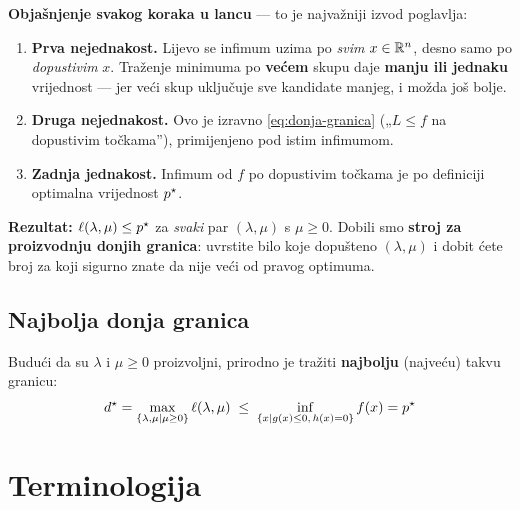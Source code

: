 \textbf{Objašnjenje svakog koraka u lancu} --- to je najvažniji izvod poglavlja:

\begin{enumerate}
  \item \textbf{Prva nejednakost.} Lijevo se infimum uzima po \emph{svim}
        $x \in \mathbb{R}^n$, desno samo po \emph{dopustivim} $x$. Traženje minimuma po
        \textbf{većem} skupu daje \textbf{manju ili jednaku} vrijednost --- jer
        veći skup uključuje sve kandidate manjeg, i možda još bolje.
  \item \textbf{Druga nejednakost.} Ovo je izravno \eqref{eq:donja-granica}
        („$L \le f$ na dopustivim točkama”), primijenjeno pod istim infimumom.
  \item \textbf{Zadnja jednakost.} Infimum od $f$ po dopustivim točkama je po
        definiciji optimalna vrijednost $p^{\star}$.
\end{enumerate}

\textbf{Rezultat:} $\ell(\lambda,\mu) \le p^{\star}$ za \emph{svaki} par
$(\lambda,\mu)$ s $\mu \ge 0$. Dobili smo \textbf{stroj za proizvodnju donjih
granica}: uvrstite bilo koje dopušteno $(\lambda,\mu)$ i dobit ćete broj za
koji sigurno znate da nije veći od pravog optimuma.

\subsection{Najbolja donja granica}

Budući da su $\lambda$ i $\mu \ge 0$ proizvoljni, prirodno je tražiti
\textbf{najbolju} (najveću) takvu granicu:
\begin{equation}
\label{eq:slaba-dualnost}
d^{\star} = \max_{\{\lambda,\mu \mid \mu\ge0\}} \ell(\lambda,\mu)
\;\le\; \inf_{\{x \mid g(x)\le0,\,h(x)=0\}} f(x) = p^{\star}
\end{equation}

\section{Terminologija}

